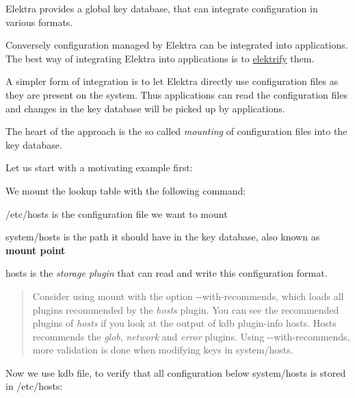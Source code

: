 Elektra provides a global key database, that can integrate configuration in various formats.

Conversely configuration managed by Elektra can be integrated into applications. The best way of integrating Elektra into applications is to \mbox{\hyperlink{doc_help_elektra-glossary_md}{elektrify}} them.

A simpler form of integration is to let Elektra directly use configuration files as they are present on the system. Thus applications can read the configuration files and changes in the key database will be picked up by applications.

The heart of the approach is the so called {\itshape mounting} of configuration files into the key database.

Let us start with a motivating example first\+:

We mount the lookup table with the following command\+:


\begin{DoxyCode}{0}
\end{DoxyCode}



\begin{DoxyEnumerate}
\item {\ttfamily /etc/hosts} is the configuration file we want to mount
\item {\ttfamily system/hosts} is the path it should have in the key database, also known as {\bfseries{mount point}}
\item {\ttfamily hosts} is the {\itshape storage plugin} that can read and write this configuration format.
\end{DoxyEnumerate}

\begin{quote}
Consider using mount with the option {\ttfamily -\/-\/with-\/recommends}, which loads all plugins recommended by the {\itshape hosts} plugin. You can see the recommended plugins of {\itshape hosts} if you look at the output of {\ttfamily kdb plugin-\/info hosts}. Hosts recommends the {\itshape glob}, {\itshape network} and {\itshape error} plugins. Using {\ttfamily -\/-\/with-\/recommends}, more validation is done when modifying keys in {\ttfamily system/hosts}. \end{quote}


Now we use {\ttfamily kdb file}, to verify that all configuration below {\ttfamily system/hosts} is stored in {\ttfamily /etc/hosts}\+:


